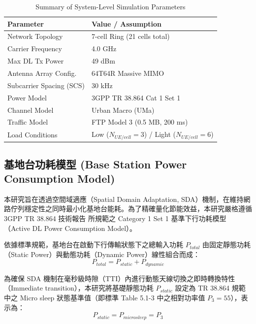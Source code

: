 \begin{table}[htbp]
\centering
\caption{Summary of System-Level Simulation Parameters}
\label{tab:sim_para}
\renewcommand{\arraystretch}{1.2}
\begin{tabular}{|l|l|}
\hline
\textbf{Parameter} & \textbf{Value / Assumption} \\ \hline
Network Topology & 7-cell Ring (21 cells total) \\ \hline
Carrier Frequency & 4.0 GHz \\ \hline
Max DL Tx Power & 49 dBm \\ \hline
Antenna Array Config. & 64T64R Massive MIMO \cite{3gpp_tr38802} \\ \hline
Subcarrier Spacing (SCS) & 30 kHz \\ \hline
Power Model & 3GPP TR 38.864 Cat 1 Set 1 \cite{3gpp2023_tr38864} \\ \hline
Channel Model & Urban Macro (UMa) \cite{3gpp_tr38901} \\ \hline
Traffic Model & FTP Model 3 (0.5 MB, 200 ms) \\ \hline
Load Conditions & Low ($N_{UE/cell}=3$) / Light ($N_{UE/cell}=6$) \\ \hline
\end{tabular}
\end{table}

\subsection{基地台功耗模型 (Base Station Power Consumption Model)}
本研究旨在透過空間域適應（Spatial Domain Adaptation, SDA）機制，在維持網路佇列穩定性之同時最小化基地台能耗。為了精確量化節能效益，本研究嚴格遵循 3GPP TR 38.864 技術報告 \cite{3gpp2023_tr38864} 所規範之 Category 1 Set 1 基準下行功耗模型（Active DL Power Consumption Model）。

依據標準規範，基地台在啟動下行傳輸狀態下之總輸入功耗 $P_{total}$ 由固定靜態功耗（Static Power）與動態功耗（Dynamic Power）線性組合而成：
\begin{equation}
P_{total} = P_{static} + P_{dynamic}
\end{equation}

為確保 SDA 機制在毫秒級時隙（TTI）內進行動態天線切換之即時轉換特性（Immediate transition），本研究將基礎靜態功耗 $P_{static}$ 設定為 TR 38.864 規範中之 Micro sleep 狀態基準值（即標準 Table 5.1-3 中之相對功率值 $P_3 = 55$），表示為：
\begin{equation}
P_{static} = P_{microsleep} = P_3
\end{equation}

